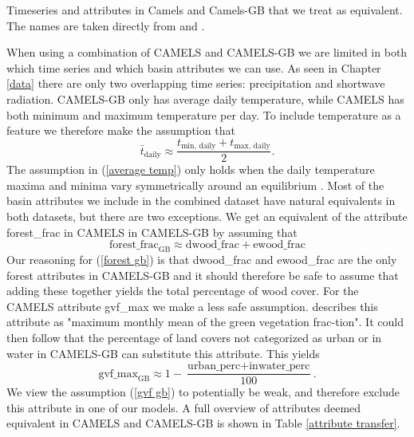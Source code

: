 \begin{table}
    \centering
    \caption{Timeseries and attributes in Camels and Camels-GB that we treat as 
    equivalent. The names are taken directly from \citet{CAMELS_US} and \citet{CAMELS_GB}.}
    
    \label{attribute transfer}
\end{table}
When using a combination of CAMELS and CAMELS-GB we are limited in both which 
time series and which basin attributes we can use.
As seen in Chapter \ref{data} there are only two overlapping time series: precipitation 
and shortwave radiation. CAMELS-GB only has 
average daily temperature, while CAMELS has both minimum and maximum temperature 
per day. To include temperature as a feature we therefore make the assumption that 
\begin{equation}
    \bar{t}_\text{daily} \approx \frac{t_\text{min, daily} + t_\text{max, daily}}{2}. \label{average temp}
\end{equation}
The assumption in (\ref{average temp}) only holds when the daily temperature maxima 
and minima vary symmetrically around an equilibrium  \citationneeded.
Most of the basin attributes we include in the combined dataset have natural equivalents 
in both datasets, but there are two exceptions. We get an equivalent of the attribute 
forest\_frac in CAMELS in CAMELS-GB by assuming that
\begin{equation}
    \text{forest\_frac}_\text{GB} \approx \text{dwood\_frac} + \text{ewood\_frac} \label{forest gb}
\end{equation}
Our reasoning for (\ref{forest gb}) is that dwood\_frac and ewood\_frac are the only 
forest attributes in CAMELS-GB and it should therefore be safe to assume that adding 
these together yields the total percentage of wood cover.
For the CAMELS attribute gvf\_max we make a less safe assumption. \citet{CAMELS_US} 
describes this attribute as "maximum monthly mean of the green vegetation frac-tion". 
It could then follow that the percentage of land covers not categorized as urban 
or in water in CAMELS-GB can substitute this attribute. This yields
\begin{equation}
    \text{gvf\_max}_\text{GB} \approx 1 - \frac{\text{urban\_perc} + \text{inwater\_perc}}{100}. \label{gvf gb}
\end{equation}
We view the assumption (\ref{gvf gb}) to potentially be weak, and therefore exclude 
this attribute in one of our models.
A full overview of attributes deemed equivalent in CAMELS and CAMELS-GB is shown in 
Table \ref{attribute transfer}.


